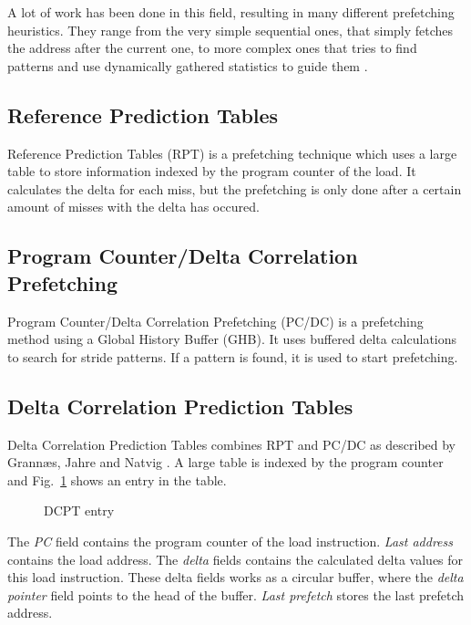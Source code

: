 A lot of work has been done in this field, resulting in many different prefetching heuristics. They
range from the very simple sequential ones, that simply fetches the address after the current one,
to more complex ones that tries to find patterns and use dynamically gathered statistics to guide
them \cite{prefetch_range}.

\subsection{Reference Prediction Tables}
Reference Prediction Tables (RPT) \cite{rpt} is a prefetching technique which uses a large table to
store information indexed by the program counter of the load. It calculates the delta for each miss,
but the prefetching is only done after a certain amount of misses with the delta has occured.

\subsection{Program Counter/Delta Correlation Prefetching}
Program Counter/Delta Correlation Prefetching (PC/DC) \cite{prefetch_range} is a prefetching method
using a Global History Buffer (GHB). It uses buffered delta calculations to search for stride
patterns. If a pattern is found, it is used to start prefetching.

\subsection{Delta Correlation Prediction Tables} 
Delta Correlation Prediction Tables combines RPT and PC/DC as described by Grann\ae s, Jahre and Natvig
\cite{dcpt}. A large table is indexed by the program counter and Fig.~\ref{fig:dcpt_entry} shows an
entry in the table.
\begin{figure}[h]
	\begin{center}
	\end{center}
	\caption{DCPT entry\label{fig:dcpt_entry}}
\end{figure}
The \emph{PC} field contains the program counter of the load instruction. \emph{Last address}
contains the load address. The \emph{delta} fields contains the calculated delta values for this
load instruction. These delta fields works as a circular buffer, where the \emph{delta pointer}
field points to the head of the buffer. \emph{Last prefetch} stores the last prefetch address. 

